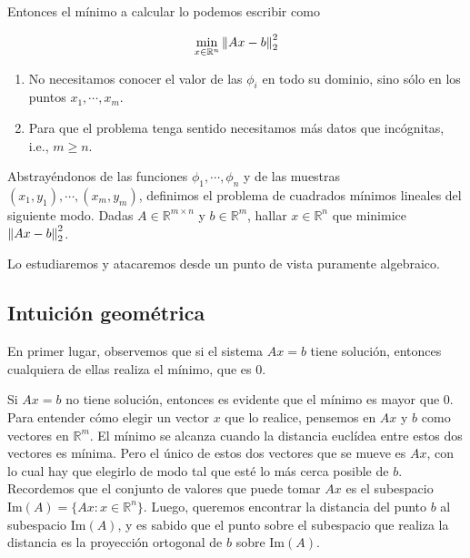 Entonces el mínimo a calcular lo podemos escribir como

\[\min \limits_{x \in \mathbb{R}^n} \left\lVert Ax - b\right\rVert_2^2\]

\begin{obs}
\hspace{1cm}
\begin{enumerate}
\item No necesitamos conocer el valor de las $\phi_i$ en todo su dominio, sino sólo en los puntos $x_1, \cdots, x_m$.
\item Para que el problema tenga sentido necesitamos más datos que incógnitas, i.e., $m \geq n$.
\end{enumerate}
\end{obs}

Abstrayéndonos de las funciones $\phi_1, \cdots, \phi_n$ y de las muestras $(x_1, y_1), \cdots, (x_m, y_m)$, definimos el problema de cuadrados mínimos lineales del siguiente modo. Dadas $A \in \mathbb{R}^{m \times n}$ y $b \in \mathbb{R}^m$, hallar $x \in \mathbb{R}^{n}$ que minimice $\left\lVert Ax - b\right\rVert_2^2$.

Lo estudiaremos y atacaremos desde un punto de vista puramente algebraico.

\subsection{Intuición geométrica}

En primer lugar, observemos que si el sistema $Ax = b$ tiene solución, entonces cualquiera de ellas realiza el mínimo, que es 0.

Si $Ax = b$ no tiene solución, entonces es evidente que el mínimo es mayor que 0. Para entender cómo elegir un vector $x$ que lo realice, pensemos en $Ax$ y $b$ como vectores en $\mathbb{R}^m$. El mínimo se alcanza cuando la distancia euclídea entre estos dos vectores es mínima. Pero el único de estos dos vectores que se mueve es $Ax$, con lo cual hay que elegirlo de modo tal que esté lo más cerca posible de $b$. Recordemos que el conjunto de valores que puede tomar $Ax$ es el subespacio $\text{Im}(A) = \{Ax : x\in \mathbb{R}^n\}$. Luego, queremos encontrar la distancia del punto $b$ al subespacio $\text{Im}(A)$, y es sabido que el punto sobre el subespacio que realiza la distancia es la proyección ortogonal de $b$ sobre $\text{Im}(A)$.

\begin{figure}[h]
\centering

\end{figure}

